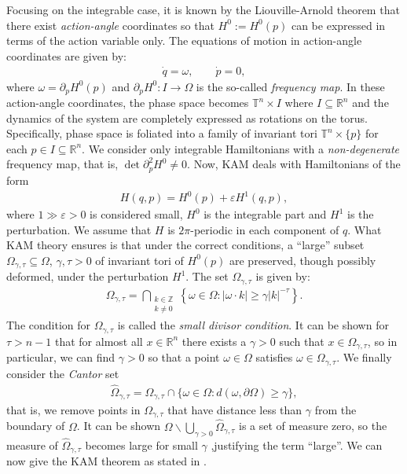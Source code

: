 Focusing on the integrable case, it is known by the Liouville-Arnold theorem that there exist \textit{action-angle} coordinates so that $H^0:=H^0(p)$ can be expressed in terms of the action variable only. The equations of motion in action-angle coordinates are given by:
\begin{align*}
\dot q = \omega, \qquad \dot p = 0,
\end{align*}
where $\omega = \partial_pH^0(p)$ and $\partial_p H^0:I\to\Omega$ is the so-called \textit{frequency map}. In these action-angle coordinates, the phase space becomes $\mathbb T^n\times I$ where $I\subseteq\mathbb R^n$ and the dynamics of the system are completely expressed as rotations on the torus. Specifically, phase space is foliated into a family of invariant tori $\mathbb T^n\times\{p\}$ for each $p\in I\subseteq \mathbb R^n$. We consider only integrable Hamiltonians with a \textit{non-degenerate} frequency map, that is, $\det\partial_p^2 H^0\neq 0$. Now, KAM deals with Hamiltonians of the form
\begin{align*}
H(q,p) = H^0(p) + \varepsilon H^1(q,p),
\end{align*}
where $1\gg\varepsilon>0$ is considered small, $H^0$ is the integrable part and $H^1$ is the perturbation. We assume that $H$ is $2\pi$-periodic in each component of $q$. What KAM theory ensures is that under the correct conditions, a ``large'' subset $\Omega_{\gamma,\tau}\subseteq\Omega$, $\gamma,\tau>0$ of invariant tori of $H^0(p)$ are preserved, though possibly deformed, under the perturbation $H^1$. The set $\Omega_{\gamma,\tau}$ is given by:
\begin{align}\label{eq:smalldivisorcondition}
\Omega_{\gamma,\tau} = \bigcap_{\substack{k\in\mathbb Z\\ k\neq 0}}\left\{ \omega\in\Omega :
|\omega \cdot k| \ge \gamma|k|^{-\tau}\right\}.
\end{align}
The condition for $\Omega_{\gamma,\tau}$ is called the \textit{small divisor condition}. It can be shown for $\tau>n-1$ that for almost all $x\in\mathbb R^n$ there exists a $\gamma>0$ such that $x\in\Omega_{\gamma,\tau}$, so in particular, we can find $\gamma>0$ so that a point $\omega\in\Omega$ satisfies $\omega\in \Omega_{\gamma,\tau}$. We finally consider the \textit{Cantor} set 
\begin{align*}
\hat\Omega_{\gamma,\tau}= \Omega_{\gamma,\tau}\cap\{\omega\in\Omega: d(\omega,\partial\Omega)\ge\gamma\},
\end{align*}
that is, we remove points in $\Omega_{\gamma,\tau}$ that have distance less than $\gamma$ from the boundary of $\Omega$. It can be shown $\Omega\backslash \bigcup_{\gamma>0}\hat\Omega_{\gamma,\tau}$ is a set of measure zero, so the measure of $\hat\Omega_{\gamma,\tau}$ becomes large for small $\gamma$ ,justifying the term ``large''. We can now give the KAM theorem as stated in \cite{poschel82}.


